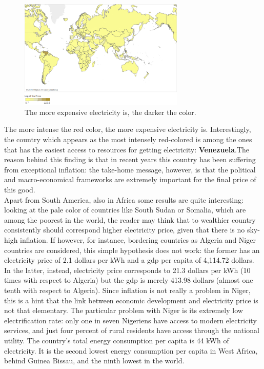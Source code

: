 \documentclass{book}
\begin{document}
\bigskip
\begin{figure}[H]
\begin{center}
\captionsetup{justification=centering}
\includegraphics[width=0.7\textwidth]{Images/world2020.png}
\caption{The more expensive electricity is, the darker the color. }
\end{center}
\end{figure}
\bigskip

The more intense the red color, the more expensive electricity is. Interestingly, the country which appears as the most intensely red-colored is among the ones that has the easiest access to resources for getting electricity: \textbf{Venezuela}.The reason behind this finding is that in recent years this country has been suffering from exceptional inflation: the take-home message, however, is that the political and macro-economical frameworks are extremely important for the final price of this good.\\

Apart from South America, also in Africa some results are quite interesting: looking at the pale color of countries like South Sudan or Somalia, which are among the poorest in the world, the reader may think that to wealthier country consistently should correspond higher electricity price, given that there is no sky-high inflation. If however, for instance, bordering countries as Algeria and Niger countries are considered, this simple hypothesis does not work: the former has an electricity price of 2.1 dollars per kWh and a gdp per capita of 4,114.72 dollars. In the latter, instead, electricity price corresponds to 21.3 dollars per kWh (10 times with respect to Algeria) but the gdp is merely 413.98 dollars (almost one tenth with respect to Algeria). Since inflation is not really a problem in Niger, this is a hint that the link between economic development and electricity price is not that elementary. The particular problem with Niger is its extremely low electrification rate: only one in seven Nigeriens have access to modern electricity services, and just four percent of rural residents have access through the national utility. The country's total energy consumption per capita is 44 kWh of electricity. It is the second lowest energy consumption per capita in West Africa, behind Guinea Bissau, and the ninth lowest in the world. 
\end{document}
